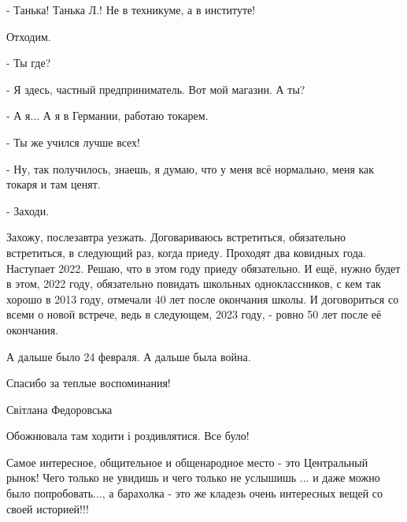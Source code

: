 - Танька! Танька Л.! Не в техникуме, а в институте!

Отходим.

- Ты где?

- Я здесь, частный предприниматель. Вот мой магазин. А ты?

- А я... А я в Германии, работаю токарем.

- Ты же учился лучше всех!

- Ну, так получилось, знаешь, я думаю, что у меня всё нормально, меня как
токаря и там ценят.

- Заходи.

Захожу, послезавтра уезжать. Договариваюсь встретиться, обязательно
встретиться, в следующий раз, когда приеду. Проходят два ковидных года.
Наступает 2022. Решаю, что в этом году приеду обязательно. И ещё, нужно будет в
этом, 2022 году, обязательно повидать школьных одноклассников, с кем так хорошо
в 2013 году, отмечали 40 лет после окончания школы. И договориться со всеми о
новой встрече, ведь в следующем, 2023 году, - ровно 50 лет после её окончания.

А дальше было 24 февраля. А дальше была война.


Спасибо за теплые воспоминания!

Світлана Федоровська

Обожнювала там ходити і роздивлятися. Все було!


Самое интересное, общительное и общенародное место - это Центральный рынок!
Чего только не увидишь и чего только не услышишь ... и даже можно было
попробовать..., а барахолка - это же кладезь очень интересных вещей со своей
историей!!!
